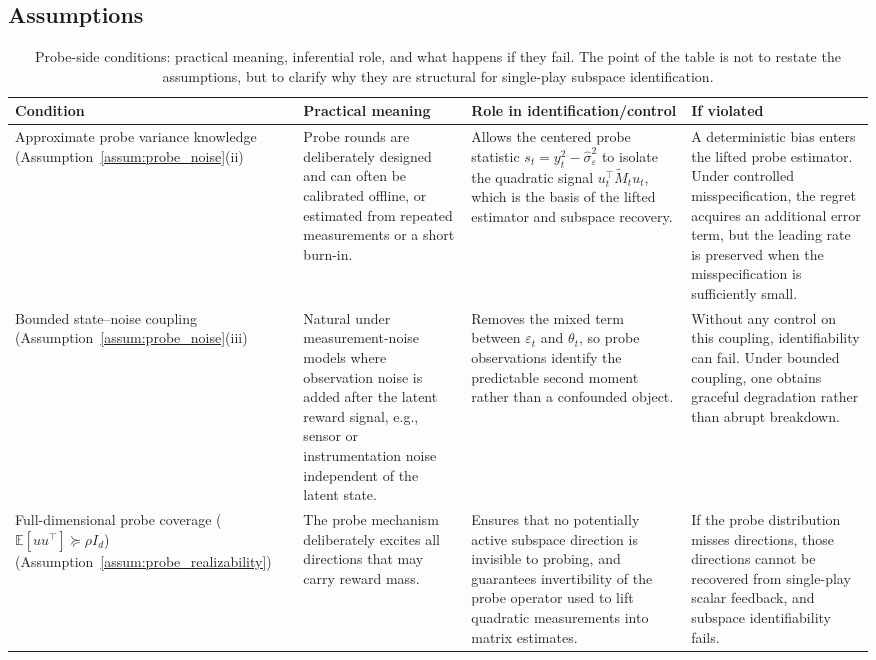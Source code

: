 \documentclass{article}
\begin{document}
\subsection{Assumptions}
\begin{table}[!htpb]
\centering
\small
\setlength{\tabcolsep}{4pt}
\renewcommand{\arraystretch}{1.12}
\caption{Probe-side conditions: practical meaning, inferential role, and what happens if they fail. The point of the table is not to restate the assumptions, but to clarify why they are structural for single-play subspace identification.}
\label{tab:probe_assumptions}
\begin{tabularx}{\linewidth}{
>{\raggedright\arraybackslash}p{2.2cm}
>{\raggedright\arraybackslash}X
>{\raggedright\arraybackslash}X
>{\raggedright\arraybackslash}X
}
\toprule
\textbf{Condition} & \textbf{Practical meaning} & \textbf{Role in identification/control} & \textbf{If violated} \\
\midrule

Approximate probe variance knowledge
(Assumption~\ref{assum:probe_noise}(ii)
&
Probe rounds are deliberately designed and can often be calibrated offline, or estimated from repeated measurements or a short burn-in.
&
Allows the centered probe statistic
\(
s_t = y_t^2 - \hat{\sigma}_\varepsilon^2
\)
to isolate the quadratic signal
\(
u_t^\top \widetilde M_t u_t
\),
which is the basis of the lifted estimator and subspace recovery.
&
A deterministic bias enters the lifted probe estimator. Under controlled misspecification, the regret acquires an additional error term, but the leading rate is preserved when the misspecification is sufficiently small. \\

\midrule

Bounded state--noise coupling
(Assumption~\ref{assum:probe_noise}(iii)
&
Natural under measurement-noise models where observation noise is added after the latent reward signal, e.g., sensor or instrumentation noise independent of the latent state.
&
Removes the mixed term between \(\varepsilon_t\) and \(\theta_t\), so probe observations identify the predictable second moment rather than a confounded object.
&
Without any control on this coupling, identifiability can fail. Under bounded coupling, one obtains graceful degradation rather than abrupt breakdown. \\

\midrule

Full-dimensional probe coverage
(\(\mathbb E[uu^\top] \succeq \rho I_d\)) (Assumption~\ref{assum:probe_realizability})
&
The probe mechanism deliberately excites all directions that may carry reward mass.
&
Ensures that no potentially active subspace direction is invisible to probing, and guarantees invertibility of the probe operator used to lift quadratic measurements into matrix estimates.
&
If the probe distribution misses directions, those directions cannot be recovered from single-play scalar feedback, and subspace identifiability fails. \\

\bottomrule
\end{tabularx}
\end{table}
\end{document}

